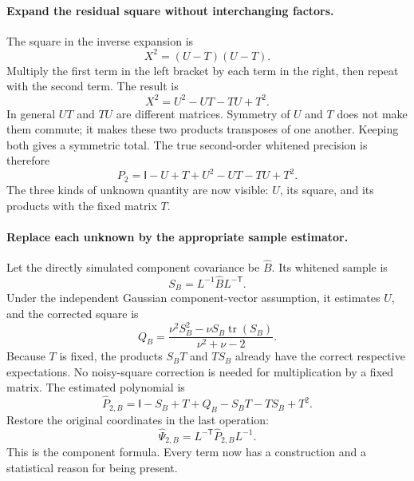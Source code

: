\documentclass[11pt]{article}
\newcommand{\I}{\mathsf{I}}
\begin{document}
\paragraph{Expand the residual square without interchanging factors.}
The square in the inverse expansion is
\begin{equation}
 X^2=(U-T)(U-T).
\end{equation}
Multiply the first term in the left bracket by each term in the right,
then repeat with the second term. The result is
\begin{equation}
 X^2=U^2-UT-TU+T^2.
\end{equation}
In general $UT$ and $TU$ are different matrices. Symmetry of $U$ and $T$
does not make them commute; it makes these two products transposes of
one another. Keeping both gives a symmetric total. The true second-order
whitened precision is therefore
\begin{equation}
 P_2=\I-U+T+U^2-UT-TU+T^2.
\end{equation}
The three kinds of unknown quantity are now visible: $U$, its square,
and its products with the fixed matrix $T$.

\paragraph{Replace each unknown by the appropriate sample estimator.}
Let the directly simulated component covariance be $\widehat B$. Its
whitened sample is
\begin{equation}
 S_B=L^{-1}\widehat B L^{-\mathsf T}.
\end{equation}
Under the independent Gaussian component-vector assumption, it estimates
$U$, and the corrected square is
\begin{equation}
 Q_B=\frac{\nu^2 S_B^2-\nu S_B\operatorname{tr}(S_B)}
                  {\nu^2+\nu-2}.
\end{equation}
Because $T$ is fixed, the products $S_BT$ and $TS_B$ already have the
correct respective expectations. No noisy-square correction is needed
for multiplication by a fixed matrix. The estimated polynomial is
\begin{equation}
 \widehat P_{2,B}=\I-S_B+T+Q_B-S_BT-TS_B+T^2.
\end{equation}
Restore the original coordinates in the last operation:
\begin{equation}
 \widehat\Psi_{2,B}=L^{-\mathsf T}\widehat P_{2,B}L^{-1}.
\end{equation}
This is the component formula. Every term now has a construction and a
statistical reason for being present.
\end{document}
